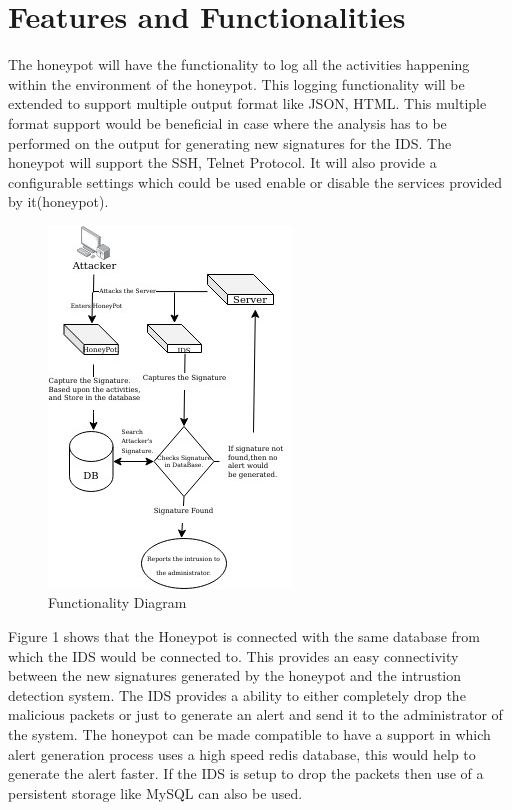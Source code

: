 \documentclass[conference]{IEEEtran}
\begin{document}
\section{Features and Functionalities}
The honeypot will have the functionality to log all the activities happening within the environment of the honeypot. This logging functionality will be extended to support multiple output format like JSON, HTML. This multiple format support would be beneficial in case where the analysis has to be performed on the output for generating new signatures for the IDS. The honeypot will support the SSH, Telnet Protocol. It will also provide a configurable settings which could be used enable or disable the services provided by it(honeypot).

\begin{figure}[htbp]
\centerline{\includegraphics{HIDS}}
\caption{Functionality Diagram}
\label{fig}
\end{figure}

Figure 1 shows that the Honeypot is connected with the same database from which the IDS would be connected to. This provides an easy connectivity between the new signatures generated by the honeypot and the intrustion detection system. The IDS provides a ability to either completely drop the malicious packets or just to generate an alert and send it to the administrator of the system. The honeypot can be made compatible to have a support in which alert generation process uses a high speed redis database, this would help to generate the alert faster. If the IDS is setup to drop the packets then use of a persistent storage like MySQL can also be used.
\end{document}
